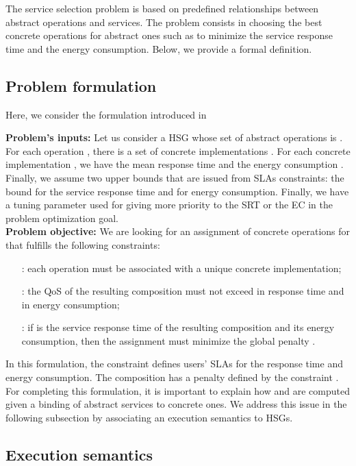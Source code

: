 \documentclass[a4paper]{article}
\begin{document}
The service selection problem is based on predefined relationships between abstract operations and services. 
The problem consists in choosing the best concrete operations for abstract ones such as 
to minimize the service response time and the energy consumption. Below, we provide a formal definition. 

\subsection{Problem formulation}

Here, we consider the formulation introduced in~\cite{JISA,cpe3015}

{\bf Problem's inputs: }
Let us consider a HSG whose set of abstract operations is .  For each operation , 
there is a set of concrete implementations . For each concrete 
implementation , we have the mean response time  and the energy consumption . 
Finally, we assume two upper bounds that are issued from SLAs constraints: the bound  for 
the service response time and  for energy consumption. Finally, we have a tuning 
parameter  used  for giving more priority to the SRT or the EC in the problem 
optimization goal.\\

{\bf Problem objective: }
We are looking for an assignment of concrete operations for  that fulfills the following constraints:
\begin{enumerate}
\item[:] each operation must be associated with a unique concrete implementation;
\item[:] the QoS of the resulting composition must not exceed  in response time and   in energy consumption;
\item[:] if  is the service response time of the resulting composition and  its energy consumption, then 
the assignment must minimize the global penalty . 
\end{enumerate}


In this formulation, the constraint  defines users' SLAs for the response time and 
energy consumption. The composition has a penalty defined by the constraint . 
For completing this formulation, it is important to explain how  and  are computed given 
a binding of abstract services to concrete ones. We address this issue in the following subsection by associating an 
execution semantics to HSGs. 

\subsection{Execution semantics}
\end{document}

